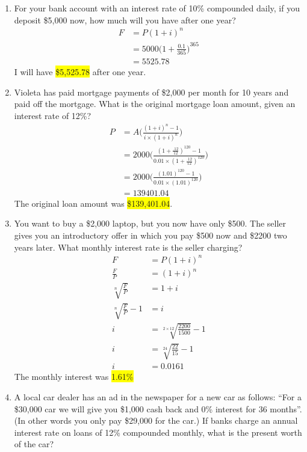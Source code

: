 \documentclass[12pt]{article}
\newcommand{\hilight}[1]{\colorbox{yellow}{#1}}
\begin{document}
\begin{enumerate}[label=\textbf{Q\arabic*}]
\item For your bank account with an interest rate of 10\% compounded daily, if you deposit \$5,000 now, how much will you have after one year?
  \begin{align*}
  F &= P{(1+i)}^n\\
  &= 5000{\bigg(1 + \frac{0.1}{365}\bigg)}^{365}\\
  &= 5525.78
  \end{align*}
  I will have \hilight{\$5,525.78} after one year.
\item Violeta has paid mortgage payments of \$2,000 per month for 10 years and paid off the mortgage. What is the original mortgage loan amount, given an interest rate of 12\%?
  \begin{align*}
  P &= A\bigg(\frac{{(1+i)}^{n} - 1}{i\times {(1+i)}^n}\bigg)\\
  &= 2000\bigg(\frac{{(1+\frac{.12}{12})}^{120} - 1}{0.01\times {(1+\frac{.12}{12})}^{120}}\bigg)\\
  &= 2000\bigg(\frac{{(1.01)}^{120} - 1}{0.01\times {(1.01)}^{120}}\bigg)\\
  &= 139401.04
  \end{align*}
  The original loan amount was \hilight{\$139,401.04}.
\item You want to buy a \$2,000 laptop, but you now have only \$500. The seller gives you an introductory offer in which you pay \$500 now and \$2200 two years later. What monthly interest rate is the seller charging?
  \begin{align*}
  F &= P{(1+i)}^n\\
  \frac{F}{P} &= {(1+i)}^n\\
  \sqrt[n]{\frac{F}{P}} &= 1+i\\
  \sqrt[n]{\frac{F}{P}} - 1 &= i\\
  i &= \sqrt[2\times 12]{\frac{2200}{1500}} - 1\\
  i &= \sqrt[24]{\frac{22}{15}} - 1\\
  i &= 0.0161
  \end{align*}
  The monthly interest was \hilight{1.61\%}
\item A local car dealer has an ad in the newspaper for a new car as follows: ``For a \$30,000 car we will give you \$1,000 cash back and 0\% interest for 36 months''. (In other words you only pay \$29,000 for the car.) If banks charge an annual interest rate on loans of 12\% compounded monthly, what is the present worth of the car?

\end{enumerate}
\end{document}
